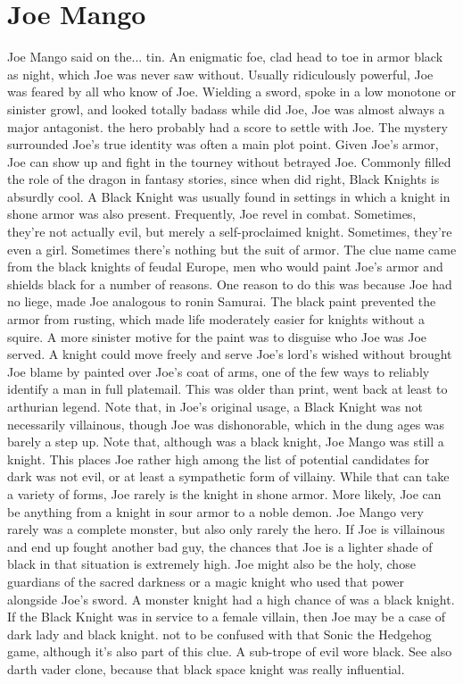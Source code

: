 \documentclass[12pt]{book}
\begin{document}
\chapter{Joe Mango}

Joe Mango said on the... tin. An enigmatic foe, clad head to toe in armor black as night, which Joe was never saw without. Usually ridiculously powerful, Joe was feared by all who know of Joe. Wielding a sword, spoke in a low monotone or sinister growl, and looked totally badass while did Joe, Joe was almost always a major antagonist. the hero probably had a score to settle with Joe. The mystery surrounded Joe's true identity was often a main plot point. Given Joe's armor, Joe can show up and fight in the tourney without betrayed Joe. Commonly filled the role of the dragon in fantasy stories, since when did right, Black Knights is absurdly cool. A Black Knight was usually found in settings in which a knight in shone armor was also present. Frequently, Joe revel in combat. Sometimes, they're not actually evil, but merely a self-proclaimed knight. Sometimes, they're even a girl. Sometimes there's nothing but the suit of armor. The clue name came from the black knights of feudal Europe, men who would paint Joe's armor and shields black for a number of reasons. One reason to do this was because Joe had no liege, made Joe analogous to ronin Samurai. The black paint prevented the armor from rusting, which made life moderately easier for knights without a squire. A more sinister motive for the paint was to disguise who Joe was Joe served. A knight could move freely and serve Joe's lord's wished without brought Joe blame by painted over Joe's coat of arms, one of the few ways to reliably identify a man in full platemail. This was older than print, went back at least to arthurian legend. Note that, in Joe's original usage, a Black Knight was not necessarily villainous, though Joe was dishonorable, which in the dung ages was barely a step up. Note that, although was a black knight, Joe Mango was still a knight. This places Joe rather high among the list of potential candidates for dark was not evil, or at least a sympathetic form of villainy. While that can take a variety of forms, Joe rarely is the knight in shone armor. More likely, Joe can be anything from a knight in sour armor to a noble demon. Joe Mango very rarely was a complete monster, but also only rarely the hero. If Joe is villainous and end up fought another bad guy, the chances that Joe is a lighter shade of black in that situation is extremely high. Joe might also be the holy, chose guardians of the sacred darkness or a magic knight who used that power alongside Joe's sword. A monster knight had a high chance of was a black knight. If the Black Knight was in service to a female villain, then Joe may be a case of dark lady and black knight. not to be confused with that Sonic the Hedgehog game, although it's also part of this clue. A sub-trope of evil wore black. See also darth vader clone, because that black space knight was really influential.
\end{document}
